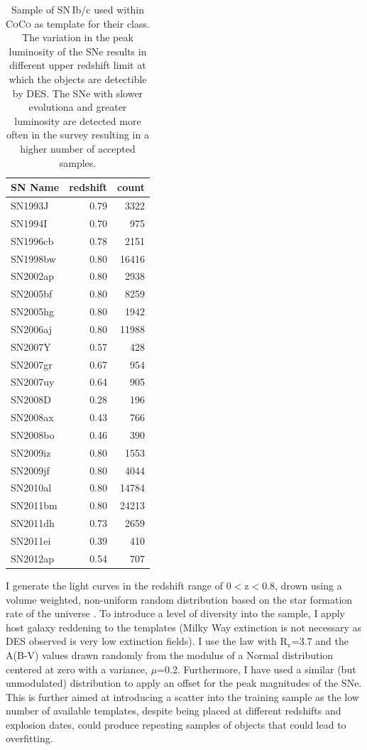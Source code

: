\begin{table}
  \caption{Sample of SN\,Ib/c used within \textsc{CoCo} as template for their class. The variation in the peak luminosity of the SNe results in different upper redshift limit at which the objects are detectible by DES. The SNe with slower evolutiona and greater luminosity are detected more often in the survey resulting in a higher number of accepted samples.}
  \label{tab:IbcTemplates}
  \centering
  \begin{tabular}{l|r|r}
    SN Name  & redshift & count \\
    \hline
    SN1993J  & 0.79 &  3322  \\
    SN1994I  & 0.70 &   975  \\
    SN1996cb & 0.78 &  2151  \\
    SN1998bw & 0.80 & 16416  \\
    SN2002ap & 0.80 &  2938  \\
    SN2005bf & 0.80 &  8259  \\
    SN2005hg & 0.80 &  1942  \\
    SN2006aj & 0.80 & 11988  \\
    SN2007Y  & 0.57 &   428  \\
    SN2007gr & 0.67 &   954  \\
    SN2007uy & 0.64 &   905  \\
    SN2008D  & 0.28 &   196  \\
    SN2008ax & 0.43 &   766  \\
    SN2008bo & 0.46 &   390  \\
    SN2009iz & 0.80 &  1553  \\
    SN2009jf & 0.80 &  4044  \\
    SN2010al & 0.80 & 14784  \\
    SN2011bm & 0.80 & 24213  \\
    SN2011dh & 0.73 &  2659  \\
    SN2011ei & 0.39 &   410  \\
    SN2012ap & 0.54 &   707
    \hline
  \end{tabular}
\end{table}

I generate the light curves in the redshift range of 0$<$z$<$0.8, drown using a volume weighted, non-uniform random distribution based on the star formation rate of the universe \citep{Hopkins2006}. To introduce a level of diversity into the sample, I apply host galaxy reddening to the templates (Milky Way extinction is not necessary as DES observed is very low extinction fields). I use the \citet{Cardelli1989} law with R$_\mathrm{v}$=3.7 and the A(B-V) values drawn randomly from the modulus of a Normal distribution centered at zero with a variance, $\mu$=0.2. Furthermore, I have used a similar (but unmodulated) distribution to apply an offset for the peak magnitudes of the SNe. This is further aimed at introducing a scatter into the training sample as the low number of available templates, despite being placed at different redshifts and explosion dates, could produce repeating samples of objects that could lead to overfitting.

